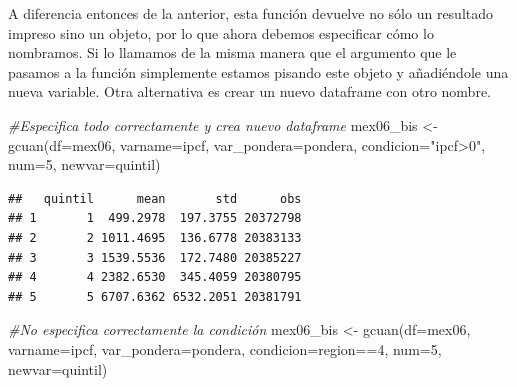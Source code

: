 \documentclass[
]{book}
\newenvironment{Shaded}{\begin{snugshade}}{\end{snugshade}}
\newcommand{\AttributeTok}[1]{\textcolor[rgb]{0.77,0.63,0.00}{#1}}
\newcommand{\CommentTok}[1]{\textcolor[rgb]{0.56,0.35,0.01}{\textit{#1}}}
\newcommand{\ConstantTok}[1]{\textcolor[rgb]{0.00,0.00,0.00}{#1}}
\newcommand{\DecValTok}[1]{\textcolor[rgb]{0.00,0.00,0.81}{#1}}
\newcommand{\FunctionTok}[1]{\textcolor[rgb]{0.00,0.00,0.00}{#1}}
\newcommand{\NormalTok}[1]{#1}
\newcommand{\OtherTok}[1]{\textcolor[rgb]{0.56,0.35,0.01}{#1}}
\newcommand{\SpecialCharTok}[1]{\textcolor[rgb]{0.00,0.00,0.00}{#1}}
\newcommand{\StringTok}[1]{\textcolor[rgb]{0.31,0.60,0.02}{#1}}
\begin{document}
\begin{Shaded}
\end{Shaded}

A diferencia entonces de la anterior, esta función devuelve no sólo un resultado impreso sino un objeto, por lo que ahora debemos especificar cómo lo nombramos. Si lo llamamos de la misma manera que el argumento que le pasamos a la función simplemente estamos pisando este objeto y añadiéndole una nueva variable. Otra alternativa es crear un nuevo dataframe con otro nombre.

\begin{Shaded}
\begin{Highlighting}[]
\CommentTok{\#Especifica todo correctamente y crea nuevo dataframe}
\NormalTok{mex06\_bis }\OtherTok{\textless{}{-}} \FunctionTok{gcuan}\NormalTok{(}\AttributeTok{df=}\NormalTok{mex06, }\AttributeTok{varname=}\NormalTok{ipcf, }\AttributeTok{var\_pondera=}\NormalTok{pondera, }\AttributeTok{condicion=}\StringTok{"ipcf\textgreater{}0"}\NormalTok{, }\AttributeTok{num=}\DecValTok{5}\NormalTok{, }\AttributeTok{newvar=}\NormalTok{quintil)}
\end{Highlighting}
\end{Shaded}

\begin{verbatim}
##   quintil      mean       std      obs
## 1       1  499.2978  197.3755 20372798
## 2       2 1011.4695  136.6778 20383133
## 3       3 1539.5536  172.7480 20385227
## 4       4 2382.6530  345.4059 20380795
## 5       5 6707.6362 6532.2051 20381791
\end{verbatim}

\begin{Shaded}
\begin{Highlighting}[]
\CommentTok{\#No especifica correctamente la condición}
\NormalTok{mex06\_bis }\OtherTok{\textless{}{-}} \FunctionTok{gcuan}\NormalTok{(}\AttributeTok{df=}\NormalTok{mex06, }\AttributeTok{varname=}\NormalTok{ipcf, }\AttributeTok{var\_pondera=}\NormalTok{pondera, }\AttributeTok{condicion=}\NormalTok{region}\SpecialCharTok{==}\DecValTok{4}\NormalTok{, }\AttributeTok{num=}\DecValTok{5}\NormalTok{, }\AttributeTok{newvar=}\NormalTok{quintil)}
\end{Highlighting}
\end{Shaded}
\end{document}
